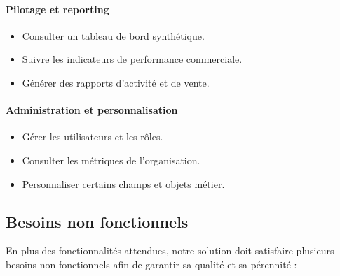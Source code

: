 \documentclass[12pt,a4paper,twoside,openany]{book}
\begin{document}
\paragraph{Pilotage et reporting}
\begin{itemize}
    \item Consulter un tableau de bord synthétique.
    \item Suivre les indicateurs de performance commerciale.
    \item Générer des rapports d’activité et de vente.
\end{itemize}

\paragraph{Administration et personnalisation}
\begin{itemize}
    \item Gérer les utilisateurs et les rôles.
    \item Consulter les métriques de l’organisation.
    \item Personnaliser certains champs et objets métier.
\end{itemize}

\subsection{Besoins non fonctionnels}

En plus des fonctionnalités attendues, notre solution doit satisfaire plusieurs besoins non fonctionnels afin de garantir sa qualité et sa pérennité :
\end{document}
